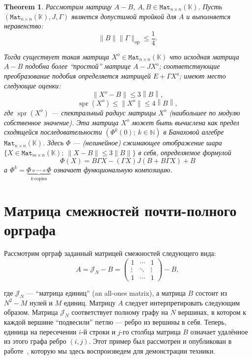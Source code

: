 \documentclass[14pt,a4paper]{extarticle}
\newtheorem{thm}{Theorem}
\theoremstyle{definition}
\begin{document}
\begin{thm}
    Рассмотрим матрицу \( A - B \),
         \( A, B \in \mathtt{Mat}_{n{\times}n}(\mathbb{K}) \).
    Пусть \( (\mathtt{Mat}_{n{\times}n}(\mathbb{K}), J, \Gamma) \)
        является допустимой тройкой для \( A \)
        и выполняется неравенство:
        \[
            \|B\|\|\Gamma\|_{\mathrm{op}} \leq \frac14.
        \]

    Тогда существует такая матрица \( X^o\in\mathtt{Mat}_{n{\times}n}(\mathbb{K}) \)
        что исходная матрица \( A - B \) подобна более ``простой'' матрице \( A
        - J X^o \);
        соответ\-ствующие преобразование подобия определяется матрицей \( E +
        \Gamma X^o \);
        имеют место следующие оценки:
        \[
            \|X^o - B\| \leq 3 \left\|B\right\|,
        \]
        \[
            \operatorname{spr}(X^o) \leq \|X^o\| \leq 4 \left\|B\right\|,
        \]
        где \( \operatorname{spr}(X^o) \)
        --- спектральный радиус матрицы \( X^o \) (наибольшее по модулю
        собственное значение).
    Эта матрица \( X^o \) может быть вычислена как предел сходящейся последовательности
        \( \left( \Phi^k(0);\ k\in\mathbb{N} \right) \)
        в Банаховой алгебре \( \mathtt{Mat}_{n{\times}n}(\mathbb{K}) \).
        Здесь \( \Phi \) --- (нелинейное) сжимающее отображение
        шара \( \{X\in\mathtt{Mat}_{m{\times}n}(\mathbb{K});\ \|X-B\|\leq 3\|B\| \} \)
        в себя, определяемое формулой
    \[
        \Phi(X) = B\Gamma X - (\Gamma X)J(B + B\Gamma X) + B
    \]
        а \( \Phi^k = \underbrace{\Phi\circ\cdots\circ\Phi}_{k\ \text{copies}} \)
        означает функциональную композицию.
\end{thm}

\section{Матрица смежностей почти-полного орграфа}
\sloppy
Рассмотрим орграф заданный матрицей смежностей следующего вида:
\[
    A = \mathcal{J}_N - B = \begin{pmatrix}1 & \cdots & 1 \\ \vdots & \ddots & \vdots \\ 1 & \cdots & 1\end{pmatrix} - B,
\]

где \( \mathcal{J}_N \) --- ``матрица единиц'' (an all-ones matrix),
а матрица \( B \) состоит из \( N^2 - M \) нулей и \( M \) единиц.
Матрицу \( A \) следует интерпретировать следующим образом.
Матрица \( \mathcal{J}_N \) соответствует полному графу на \( N \) вершинах, в
котором к каждой вершине ``подвесили'' петлю --- ребро из вершины в себя.
Теперь, единица на пересечении
\( i \)-й строки и \( j \)-го столбца матрица \( B \)
означает удалённое из этого графа ребро \( (i, j) \).
Этот пример был рассмотрен и опубликован в работе~\cite{sergekozlukov@volgograd},
которую мы здесь воспроизведем для демонстрации техники.
\end{document}

